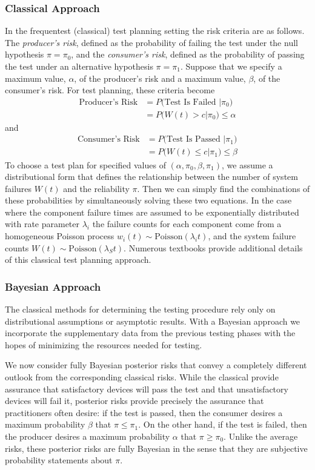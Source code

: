 \documentclass[12pt]{article}
\begin{document}
\subsubsection{Classical Approach}
In the frequentest (classical) test planning setting the risk criteria
are as follows. The \emph{producer's risk}, defined as the probability of
failing the test under the null hypothesis $\pi = \pi_0$, and the
\emph{consumer's risk}, defined as the probability of passing the test under an
alternative hypothesis $\pi = \pi_1$.  Suppose that we specify a maximum value,
$\alpha$, of the producer's risk and a maximum value, $\beta$, of the consumer's
risk. For test planning, these criteria become
$$
\begin{aligned}
	\text{Producer's Risk} &= P \text{(Test Is Failed } \vert \pi_0 \text{)} \\ &=
	P \text{(} W(t) > c \vert \pi_0 \text{)} \leq \alpha
\end{aligned}
$$
and
$$
\begin{aligned}
	\text{Consumer's Risk} &= P \text{(Test Is Passed } \vert \pi_1 \text{)} \\ &=
	P \text{(} W(t) \leq c \vert \pi_1 \text{)} \leq \beta
\end{aligned}
$$
To choose a test plan for specified values of $(\alpha, \pi_0, \beta, \pi_1)$,
we assume a distributional form that defines the relationship between the number
of system failures $W(t)$ and the reliability $\pi$.  Then we can simply find
the combinations of these probabilities by simultaneously solving these two
equations.  In the case where the component failure times are assumed to be
exponentially distributed with rate parameter $\lambda_i$ the failure counts for
each component come from a homogeneous Poisson process $w_i(t) \sim
\text{Poisson}(\lambda_i t)$, and the system failure counts $W(t) \sim
\text{Poisson}(\lambda_S t)$.  Numerous textbooks provide additional details of
this classical test planning approach.

\subsubsection{Bayesian Approach}
The classical methods for determining the testing procedure rely only on
distributional assumptions or asymptotic results. With a Bayesian approach we
incorporate the supplementary data from the previous testing phases with the
hopes of minimizing the resources needed for testing.

We now consider fully Bayesian posterior risks that convey a completely
different outlook from the corresponding classical risks.  While the classical
provide assurance that satisfactory devices will pass the test and that
unsatisfactory devices will fail it, posterior risks provide precisely the
assurance that practitioners often desire: if the test is passed, then the
consumer desires a maximum probability $\beta$ that $\pi \leq \pi_1$. On the
other hand, if the test is failed, then the producer desires a maximum
probability $\alpha$ that $\pi \geq \pi_0$. Unlike the average risks, these
posterior risks are fully Bayesian in the sense that they are subjective
probability statements about $\pi$.
\end{document}

